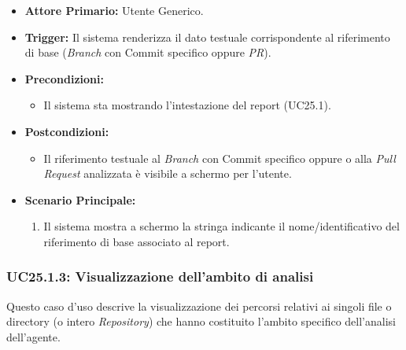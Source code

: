 \documentclass[12pt, a4paper]{article}
\begin{document}
\begin{itemize}
    \item \textbf{Attore Primario:} Utente Generico.
    \item \textbf{Trigger:} Il sistema renderizza il dato testuale corrispondente al riferimento di base (\textit{Branch} con Commit specifico oppure \textit{PR}).
    \item \textbf{Precondizioni:}
    \begin{itemize}
        \item Il sistema sta mostrando l'intestazione del report (UC25.1).
    \end{itemize}
    \item \textbf{Postcondizioni:}
    \begin{itemize}
        \item Il riferimento testuale al \textit{Branch} con Commit specifico oppure o alla \textit{Pull Request} analizzata è visibile a schermo per l'utente.
    \end{itemize}
    \item \textbf{Scenario Principale:}
    \begin{enumerate}
        \item Il sistema mostra a schermo la stringa indicante il nome/identificativo del riferimento di base associato al report.
    \end{enumerate}
\end{itemize}

\subsubsection{UC25.1.3: Visualizzazione dell'ambito di analisi}\label{uc:25.1.3}
Questo caso d'uso descrive la visualizzazione dei percorsi relativi ai singoli file o directory (o intero \textit{Repository}) che hanno costituito l'ambito specifico dell'analisi dell'agente.
\end{document}
